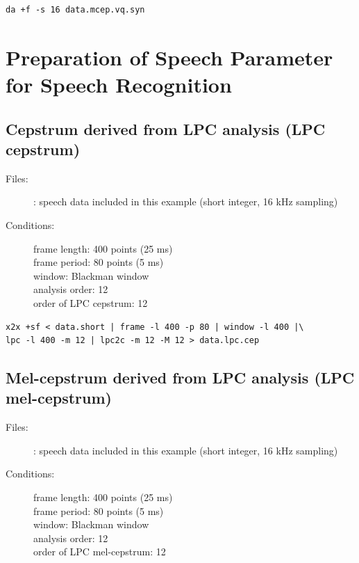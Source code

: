 \documentclass[a4paper,10pt]{article}
\begin{document}
\begin{verbatim}
da +f -s 16 data.mcep.vq.syn
\end{verbatim}

\section{Preparation of Speech Parameter for Speech Recognition}

\subsection{Cepstrum derived from LPC analysis (LPC cepstrum)}

\begin{description}
\item[Files:] 
  : speech data included in this example (short integer, 16 kHz sampling)
\item[Conditions:]
  frame length: 400 points (25 ms)\\
  frame period: 80 points (5 ms)\\
  window: Blackman window\\
  analysis order: 12\\
  order of LPC cepstrum: 12
\end{description}

\begin{verbatim}
x2x +sf < data.short | frame -l 400 -p 80 | window -l 400 |\
lpc -l 400 -m 12 | lpc2c -m 12 -M 12 > data.lpc.cep
\end{verbatim}

\subsection{Mel-cepstrum derived from LPC analysis
  (LPC mel-cepstrum)}

\begin{description}
\item[Files:]
  : speech data included in this example (short integer, 16 kHz sampling)
\item[Conditions:]
  frame length: 400 points (25 ms)\\
  frame period: 80 points (5 ms)\\
  window: Blackman window\\
  analysis order: 12\\
  order of LPC mel-cepstrum: 12
\end{description}
\end{document}
